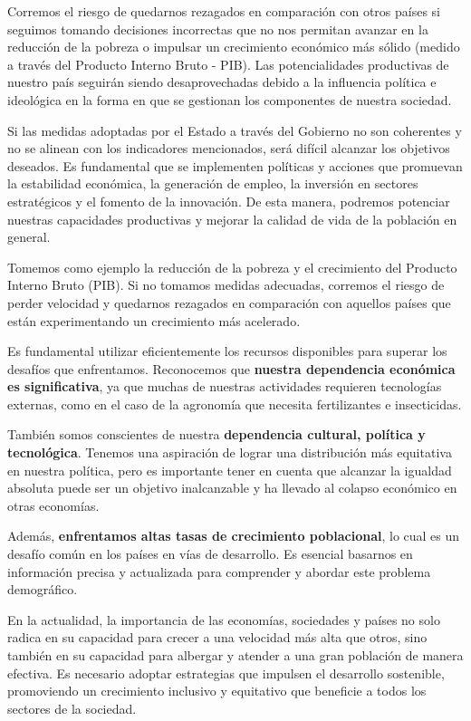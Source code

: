 \documentclass[
  a4paper,
]{article}
\begin{document}
Corremos el riesgo de quedarnos rezagados en comparación con otros
países si seguimos tomando decisiones incorrectas que no nos permitan
avanzar en la reducción de la pobreza o impulsar un crecimiento
económico más sólido (medido a través del Producto Interno Bruto - PIB).
Las potencialidades productivas de nuestro país seguirán siendo
desaprovechadas debido a la influencia política e ideológica en la forma
en que se gestionan los componentes de nuestra sociedad.

Si las medidas adoptadas por el Estado a través del Gobierno no son
coherentes y no se alinean con los indicadores mencionados, será difícil
alcanzar los objetivos deseados. Es fundamental que se implementen
políticas y acciones que promuevan la estabilidad económica, la
generación de empleo, la inversión en sectores estratégicos y el fomento
de la innovación. De esta manera, podremos potenciar nuestras
capacidades productivas y mejorar la calidad de vida de la población en
general.

Tomemos como ejemplo la reducción de la pobreza y el crecimiento del
Producto Interno Bruto (PIB). Si no tomamos medidas adecuadas, corremos
el riesgo de perder velocidad y quedarnos rezagados en comparación con
aquellos países que están experimentando un crecimiento más acelerado.

Es fundamental utilizar eficientemente los recursos disponibles para
superar los desafíos que enfrentamos. Reconocemos que \textbf{nuestra
dependencia económica es significativa}, ya que muchas de nuestras
actividades requieren tecnologías externas, como en el caso de la
agronomía que necesita fertilizantes e insecticidas.

También somos conscientes de nuestra \textbf{dependencia cultural,
política y tecnológica}. Tenemos una aspiración de lograr una
distribución más equitativa en nuestra política, pero es importante
tener en cuenta que alcanzar la igualdad absoluta puede ser un objetivo
inalcanzable y ha llevado al colapso económico en otras economías.

Además, \textbf{enfrentamos altas tasas de crecimiento poblacional}, lo
cual es un desafío común en los países en vías de desarrollo. Es
esencial basarnos en información precisa y actualizada para comprender y
abordar este problema demográfico.

En la actualidad, la importancia de las economías, sociedades y países
no solo radica en su capacidad para crecer a una velocidad más alta que
otros, sino también en su capacidad para albergar y atender a una gran
población de manera efectiva. Es necesario adoptar estrategias que
impulsen el desarrollo sostenible, promoviendo un crecimiento inclusivo
y equitativo que beneficie a todos los sectores de la sociedad.
\end{document}
